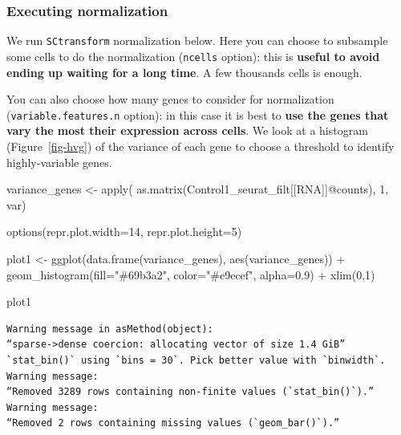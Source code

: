 \documentclass[
  letterpaper,
  DIV=11,
  numbers=noendperiod]{scrartcl}
\newenvironment{Shaded}{\begin{snugshade}}{\end{snugshade}}
\newcommand{\AttributeTok}[1]{\textcolor[rgb]{0.40,0.45,0.13}{#1}}
\newcommand{\DecValTok}[1]{\textcolor[rgb]{0.68,0.00,0.00}{#1}}
\newcommand{\FloatTok}[1]{\textcolor[rgb]{0.68,0.00,0.00}{#1}}
\newcommand{\FunctionTok}[1]{\textcolor[rgb]{0.28,0.35,0.67}{#1}}
\newcommand{\NormalTok}[1]{\textcolor[rgb]{0.00,0.23,0.31}{#1}}
\newcommand{\OtherTok}[1]{\textcolor[rgb]{0.00,0.23,0.31}{#1}}
\newcommand{\SpecialCharTok}[1]{\textcolor[rgb]{0.37,0.37,0.37}{#1}}
\newcommand{\StringTok}[1]{\textcolor[rgb]{0.13,0.47,0.30}{#1}}
\begin{document}
\subsubsection{Executing normalization}\label{executing-normalization}

We run \texttt{SCtransform} normalization below. Here you can choose to
subsample some cells to do the normalization (\texttt{ncells} option):
this is \textbf{useful to avoid ending up waiting for a long time}. A
few thousands cells is enough.

You can also choose how many genes to consider for normalization
(\texttt{variable.features.n} option): in this case it is best to
\textbf{use the genes that vary the most their expression across cells}.
We look at a histogram (Figure~\ref{fig-hvg}) of the variance of each
gene to choose a threshold to identify highly-variable genes.

\begin{Shaded}
\begin{Highlighting}[]
\NormalTok{variance\_genes }\OtherTok{\textless{}{-}} \FunctionTok{apply}\NormalTok{( }\FunctionTok{as.matrix}\NormalTok{(Control1\_seurat\_filt[[}\StringTok{\textquotesingle{}RNA\textquotesingle{}}\NormalTok{]]}\SpecialCharTok{@}\NormalTok{counts), }\DecValTok{1}\NormalTok{, var)}

\FunctionTok{options}\NormalTok{(}\AttributeTok{repr.plot.width=}\DecValTok{14}\NormalTok{, }\AttributeTok{repr.plot.height=}\DecValTok{5}\NormalTok{)}

\NormalTok{plot1 }\OtherTok{\textless{}{-}} \FunctionTok{ggplot}\NormalTok{(}\FunctionTok{data.frame}\NormalTok{(variance\_genes), }\FunctionTok{aes}\NormalTok{(variance\_genes)) }\SpecialCharTok{+} 
     \FunctionTok{geom\_histogram}\NormalTok{(}\AttributeTok{fill=}\StringTok{"\#69b3a2"}\NormalTok{, }\AttributeTok{color=}\StringTok{"\#e9ecef"}\NormalTok{, }\AttributeTok{alpha=}\FloatTok{0.9}\NormalTok{) }\SpecialCharTok{+} \FunctionTok{xlim}\NormalTok{(}\DecValTok{0}\NormalTok{,}\DecValTok{1}\NormalTok{)}

\NormalTok{plot1}
\end{Highlighting}
\end{Shaded}

\begin{verbatim}
Warning message in asMethod(object):
“sparse->dense coercion: allocating vector of size 1.4 GiB”
`stat_bin()` using `bins = 30`. Pick better value with `binwidth`.
Warning message:
“Removed 3289 rows containing non-finite values (`stat_bin()`).”
Warning message:
“Removed 2 rows containing missing values (`geom_bar()`).”
\end{verbatim}
\end{document}

